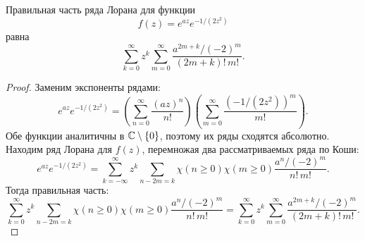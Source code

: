 \documentclass[../paper.tex]{subfiles}
\begin{document}
\begin{Lem}
\label{laurent-2}
Правильная часть ряда Лорана для функции
\[
	f(z) = e^{az} e^{-1/(2z^2)}
\]
равна
\[
	\sum_{k=0}^{\infty} z^k \sum_{m=0}^{\infty} \frac{a^{2m+k} / (-2)^m}{(2m+k)!\,m!}
.\]
\end{Lem}

\begin{proof}
Заменим экспоненты рядами:
\[
	e^{az} e^{-1/(2z^2)}
	= \left( \sum_{n=0}^{\infty} \frac{(az)^n}{n!} \right)
		\left( \sum_{m=0}^{\infty} \frac{\left( -1 / \left( 2z^2 \right) \right)^m}{m!}  \right) 
.\]
Обе функции аналитичны в $\mathbb{C} \setminus \{0\}$, поэтому их ряды сходятся абсолютно.
Находим ряд Лорана для $f(z)$, перемножая два рассматриваемых ряда по Коши:
\[
	e^{az} e^{-1/(2z^2)}
	= \sum_{k=-\infty}^{\infty} z^k \sum_{n-2m=k} \chi(n \ge 0) \chi(m \ge 0) \frac{a^n / (-2)^m}{n!\,m!}
.\]
Тогда правильная часть:
\[
    \sum_{k=0}^{\infty} z^k \sum_{n-2m=k} \chi(n \ge 0) \chi(m \ge 0) \frac{a^n / (-2)^m}{n!\,m!} =
    \sum_{k=0}^{\infty} z^k \sum_{m=0}^{\infty} \frac{a^{2m+k} / (-2)^m}{(2m+k)!\,m!}
.\]
\end{proof}
\end{document}
